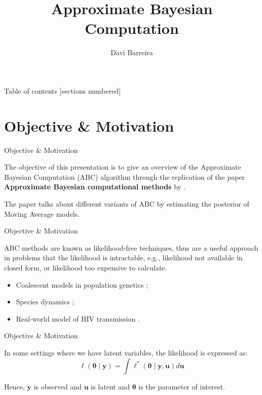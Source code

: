 \documentclass[10pt]{beamer}
\title{Approximate Bayesian Computation}
\subtitle{}
\date{}
\author{Davi Barreira}
\institute{FGV - Escola de Matemática Aplicada}
\begin{document}
\maketitle

\begin{frame}{Table of contents}
  [sections numbered]
  \tableofcontents[hideallsubsections]
\end{frame}

\AtBeginSection{}
\section[Objective Motivation]{Objective \& Motivation}
\begin{frame}[fragile]{Objective \& Motivation}

  The objective of this presentation is to give an overview of
  the Approximate Bayesian Computation (ABC) algorithm through the
  replication of the
  paper \textbf{Approximate Bayesian computational methods} by
  \cite{Marin2012}.

  The paper talks about different variants of ABC by estimating the
  posterior of Moving Average models.

\end{frame}

\begin{frame}[fragile]{Objective \& Motivation}

  ABC methods are known as likelihood-free techniques, thus are
  a useful approach in problems that the likelihood is intractable, e.g., likelihood not available in
  closed form, or likelihood too expensive to calculate.
  \begin{itemize}
    \item Coalescent models in population genetics \citep{Tavare505};
    \item Species dynamics \citep{Jabot2016};
    \item Real-world model of HIV transmission \citep{McKinley2018}.
  \end{itemize}

\end{frame}

\begin{frame}[fragile]{Objective \& Motivation}

  In some settings where we have latent variables, the likelihood is
  expressed as:
  $$\ell(\bm\theta \mid \bm y) =
  \bm\int \ell^*(\bm\theta \mid \bm y, \bm u) d\bm u$$

  Hence, $\bm y$ is observed and $\bm u$ is latent and $\bm\theta$
  is the parameter of interest.

\end{frame}
\end{document}
